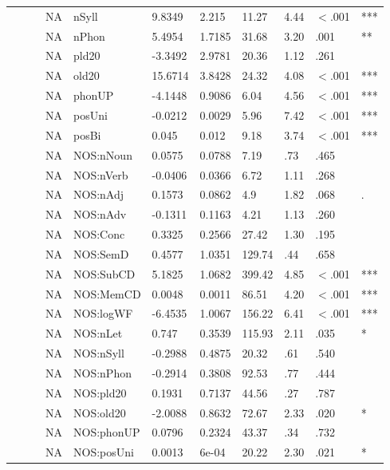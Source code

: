 \begin{table}[ht]
\begin{tabular}{lllllllllll}
   &  &  & NA & nSyll & 9.8349 & 2.215 & 11.27 & 4.44 & $<$.001 & *** \\ 
   &  &  & NA & nPhon & 5.4954 & 1.7185 & 31.68 & 3.20 & .001 & ** \\ 
   &  &  & NA & pld20 & -3.3492 & 2.9781 & 20.36 & 1.12 & .261 &   \\ 
   &  &  & NA & old20 & 15.6714 & 3.8428 & 24.32 & 4.08 & $<$.001 & *** \\ 
   &  &  & NA & phonUP & -4.1448 & 0.9086 & 6.04 & 4.56 & $<$.001 & *** \\ 
   &  &  & NA & posUni & -0.0212 & 0.0029 & 5.96 & 7.42 & $<$.001 & *** \\ 
   &  &  & NA & posBi & 0.045 & 0.012 & 9.18 & 3.74 & $<$.001 & *** \\ 
   &  &  & NA & NOS:nNoun & 0.0575 & 0.0788 & 7.19 & .73 & .465 &   \\ 
   &  &  & NA & NOS:nVerb & -0.0406 & 0.0366 & 6.72 & 1.11 & .268 &   \\ 
   &  &  & NA & NOS:nAdj & 0.1573 & 0.0862 & 4.9 & 1.82 & .068 & . \\ 
   &  &  & NA & NOS:nAdv & -0.1311 & 0.1163 & 4.21 & 1.13 & .260 &   \\ 
   &  &  & NA & NOS:Conc & 0.3325 & 0.2566 & 27.42 & 1.30 & .195 &   \\ 
   &  &  & NA & NOS:SemD & 0.4577 & 1.0351 & 129.74 & .44 & .658 &   \\ 
   &  &  & NA & NOS:SubCD & 5.1825 & 1.0682 & 399.42 & 4.85 & $<$.001 & *** \\ 
   &  &  & NA & NOS:MemCD & 0.0048 & 0.0011 & 86.51 & 4.20 & $<$.001 & *** \\ 
   &  &  & NA & NOS:logWF & -6.4535 & 1.0067 & 156.22 & 6.41 & $<$.001 & *** \\ 
   &  &  & NA & NOS:nLet & 0.747 & 0.3539 & 115.93 & 2.11 & .035 & * \\ 
   &  &  & NA & NOS:nSyll & -0.2988 & 0.4875 & 20.32 & .61 & .540 &   \\ 
   &  &  & NA & NOS:nPhon & -0.2914 & 0.3808 & 92.53 & .77 & .444 &   \\ 
   &  &  & NA & NOS:pld20 & 0.1931 & 0.7137 & 44.56 & .27 & .787 &   \\ 
   &  &  & NA & NOS:old20 & -2.0088 & 0.8632 & 72.67 & 2.33 & .020 & * \\ 
   &  &  & NA & NOS:phonUP & 0.0796 & 0.2324 & 43.37 & .34 & .732 &   \\ 
   &  &  & NA & NOS:posUni & 0.0013 & 6e-04 & 20.22 & 2.30 & .021 & * \\ 

\end{tabular}
\end{table}
